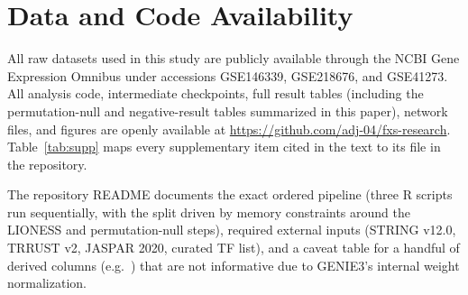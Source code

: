 \documentclass[journal]{IEEEtran}
\begin{document}
\section*{Data and Code Availability}
All raw datasets used in this study are publicly available through the NCBI Gene Expression Omnibus under accessions GSE146339, GSE218676, and GSE41273. All analysis code, intermediate checkpoints, full result tables (including the permutation-null and negative-result tables summarized in this paper), network files, and figures are openly available at \url{https://github.com/adj-04/fxs-research}. Table~\ref{tab:supp} maps every supplementary item cited in the text to its file in the repository.

The repository README documents the exact ordered pipeline (three R scripts run sequentially, with the split driven by memory constraints around the LIONESS and permutation-null steps), required external inputs (STRING v12.0, TRRUST v2, JASPAR 2020, curated TF list), and a caveat table for a handful of derived columns (e.g.\ ) that are not informative due to GENIE3's internal weight normalization.
\end{document}
